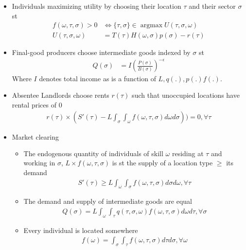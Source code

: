\documentclass[10pt, final]{article}
\DeclareMathOperator{\argmax}{argmax}
\begin{document}
\begin{itemize}
    \item Individuals maximizing utility by choosing their location $\tau$ and their sector $\sigma$ st
    \begin{align}
        f(\omega, \tau, \sigma) > 0 &\Leftrightarrow \{\tau, \sigma\} \in \argmax U(\tau, \sigma, \omega) \\
        U(\tau, \sigma, \omega) &= T(\tau) H(\omega, \sigma) p(\sigma) - r(\tau)
    \end{align}

    \item Final-good producers choose intermediate goods indexed by $\sigma$ st
    \begin{align}
        Q(\sigma) &= I(\frac{P(\sigma)}{B(\sigma)})^{-\epsilon}
    \end{align} 
    Where $I$ denotes total income as is a function of $L, q(.), p(.) f(.)$. 

    \item Absentee Landlords choose rents $r(\tau)$ such that unoccupied locations have rental prices of $0$
    \begin{align}
        r(\tau) \times (S'(\tau) - L \int_{\sigma} \int_{\omega} f(\omega, \tau, \sigma) d \omega d \sigma)) = 0, \forall \tau
    \end{align}


    \item Market clearing
    \begin{itemize}
        \item The endogenous quantity of individuals of skill $\omega$ residing at $\tau$ and working in $\sigma$, $L \times f(\omega, \tau, \sigma)$ is st the supply of a location type $\geq$ its demand
        \begin{align}
            S'(\tau) \geq L \int_{\omega} \int_{\sigma} f(\omega, \tau, \sigma) d \sigma d \omega, \forall \tau
        \end{align}


        \item The demand and supply of intermediate goods are equal
        \begin{align}
            Q(\sigma) = L \int_{\omega} \int_{\tau} q(\tau, \sigma, \omega) f(\omega, \tau, \sigma) d\omega d\tau, \forall \sigma
        \end{align}


        \item Every individual is located somewhere
        \begin{align}
            f(\omega) = \int_{\sigma} \int_{\tau} f(\omega, \tau, \sigma) d \tau d \sigma, \forall \omega
        \end{align}
    \end{itemize}
\end{itemize}
\end{document}
